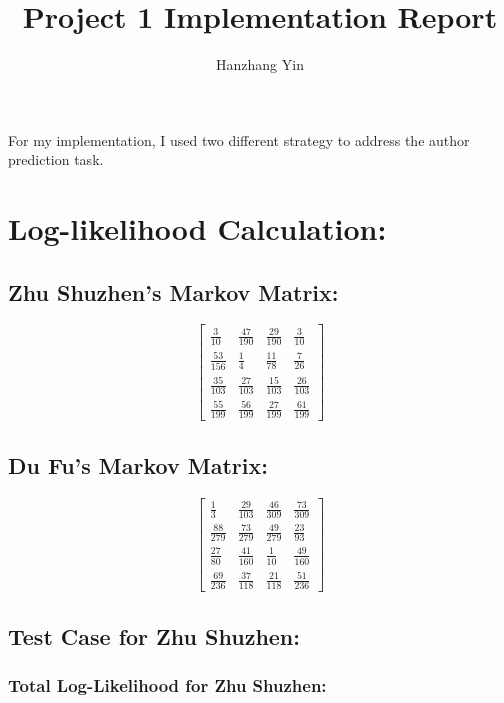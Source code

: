 \documentclass[12pt]{article}
\title{\vspace{-2cm}Project 1 Implementation Report}
\author{Hanzhang Yin}
\begin{document}
\maketitle

\noindent For my implementation, I used two different strategy to address the author prediction task.

\section*{Log-likelihood Calculation: }

\subsection*{Zhu Shuzhen's Markov Matrix:}

\[
\begin{bmatrix}
\frac{3}{10} & \frac{47}{190} & \frac{29}{190} & \frac{3}{10} \\
\frac{53}{156} & \frac{1}{4} & \frac{11}{78} & \frac{7}{26} \\
\frac{35}{103} & \frac{27}{103} & \frac{15}{103} & \frac{26}{103} \\
\frac{55}{199} & \frac{56}{199} & \frac{27}{199} & \frac{61}{199}
\end{bmatrix}
\]

\subsection*{Du Fu's Markov Matrix:}

\[
\begin{bmatrix}
\frac{1}{3} & \frac{29}{103} & \frac{46}{309} & \frac{73}{309} \\
\frac{88}{279} & \frac{73}{279} & \frac{49}{279} & \frac{23}{93} \\
\frac{27}{80} & \frac{41}{160} & \frac{1}{10} & \frac{49}{160} \\
\frac{69}{236} & \frac{37}{118} & \frac{21}{118} & \frac{51}{236}
\end{bmatrix}
\]

\subsection*{Test Case for Zhu Shuzhen: }

\subsubsection*{Total Log-Likelihood for Zhu Shuzhen:}
\end{document}
